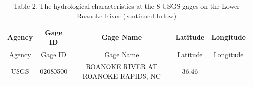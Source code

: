 \documentclass[12pt,]{article}
\begin{document}
\begin{longtable}[]{@{}ccccc@{}}
\caption{Table 2. The hydrological characteristics at the 8 USGS gages
on the Lower Roanoke River (continued below)}\tabularnewline
\toprule
\begin{minipage}[b]{0.10\columnwidth}\centering\strut
Agency\strut
\end{minipage} & \begin{minipage}[b]{0.15\columnwidth}\centering\strut
Gage ID\strut
\end{minipage} & \begin{minipage}[b]{0.36\columnwidth}\centering\strut
Gage Name\strut
\end{minipage} & \begin{minipage}[b]{0.12\columnwidth}\centering\strut
Latitude\strut
\end{minipage} & \begin{minipage}[b]{0.12\columnwidth}\centering\strut
Longitude\strut
\end{minipage}\tabularnewline
\midrule
\endfirsthead
\toprule
\begin{minipage}[b]{0.10\columnwidth}\centering\strut
Agency\strut
\end{minipage} & \begin{minipage}[b]{0.15\columnwidth}\centering\strut
Gage ID\strut
\end{minipage} & \begin{minipage}[b]{0.36\columnwidth}\centering\strut
Gage Name\strut
\end{minipage} & \begin{minipage}[b]{0.12\columnwidth}\centering\strut
Latitude\strut
\end{minipage} & \begin{minipage}[b]{0.12\columnwidth}\centering\strut
Longitude\strut
\end{minipage}\tabularnewline
\midrule
\endhead
\begin{minipage}[t]{0.10\columnwidth}\centering\strut
USGS\strut
\end{minipage} & \begin{minipage}[t]{0.15\columnwidth}\centering\strut
02080500\strut
\end{minipage} & \begin{minipage}[t]{0.36\columnwidth}\centering\strut
ROANOKE RIVER AT ROANOKE RAPIDS, NC\strut
\end{minipage} & \begin{minipage}[t]{0.12\columnwidth}\centering\strut
36.46\strut
\end{minipage} & \begin{minipage}[t]{0.12\columnwidth}\centering\strut

\end{minipage}
\end{longtable}
\end{document}
